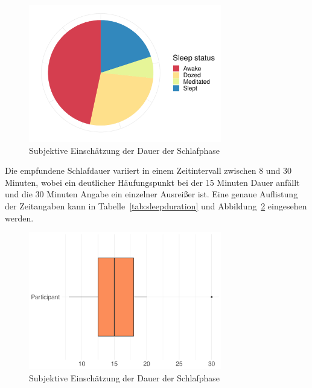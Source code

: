 \begin{figure}
	\centering
	\includegraphics[width=0.75\textwidth]{./_StudyResults/slept}
	\caption{Subjektive Einschätzung der Dauer der Schlafphase}
	\label{fig:slept}
\end{figure}

Die empfundene Schlafdauer variiert in einem Zeitintervall zwischen 8 und 30 Minuten, wobei ein deutlicher Häufungspunkt bei der 15 Minuten Dauer anfällt und die 30 Minuten Angabe ein einzelner Ausreißer ist. Eine genaue Auflistung der Zeitangaben kann in Tabelle~\ref{tab:sleepduration} und Abbildung~\ref{fig:subjectiveSleepDuration} eingesehen werden.

\begin{figure}
	\centering
	\includegraphics[width=0.75\textwidth]{./_StudyResults/subjectiveSleepDuration}
	\caption{Subjektive Einschätzung der Dauer der Schlafphase}
	\label{fig:subjectiveSleepDuration}
\end{figure}

